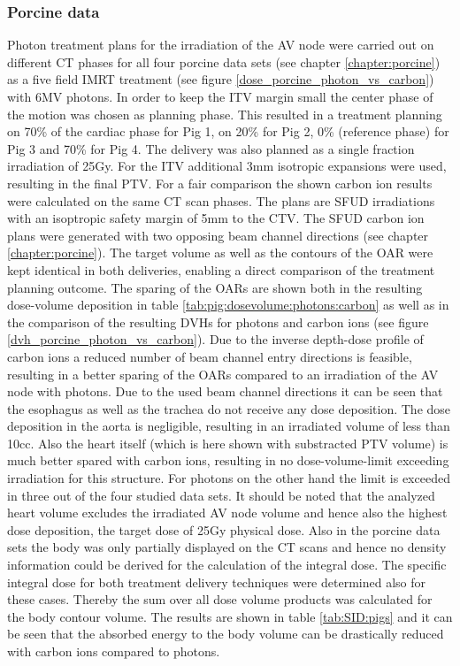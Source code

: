 \newpage

\subsubsection{Porcine data}

Photon treatment plans for the irradiation of the AV node were carried out on different CT phases for all four porcine data sets (see chapter 
\ref{chapter:porcine}) as a five field IMRT treatment (see figure \ref{dose_porcine_photon_vs_carbon}) with 6MV photons. In order to keep the 
ITV margin small the center phase of the motion was chosen as planning phase. This resulted in a treatment planning on 70\% of the cardiac 
phase for Pig 1, on 20\% for Pig 2, 0\% (reference phase) for Pig 3 and 70\% for Pig 4. The delivery was also planned as a single fraction 
irradiation of 25Gy. For the ITV additional 3mm isotropic expansions were used, resulting in the final PTV. For a fair comparison the shown 
carbon ion results were calculated on the same CT scan phases. The plans are SFUD irradiations with an isoptropic safety margin of 5mm to the 
CTV. The SFUD carbon ion plans were generated with two opposing beam channel directions (see chapter \ref{chapter:porcine}). The target volume 
as well as the contours of the OAR were kept identical in both deliveries, enabling a direct comparison of the treatment planning outcome.\newline
\newline
The sparing of the OARs are shown both in the resulting dose-volume deposition 
in table \ref{tab:pig:dosevolume:photons:carbon} as well as in the comparison of the resulting DVHs for photons and carbon 
ions (see figure \ref{dvh_porcine_photon_vs_carbon}). Due to the inverse depth-dose profile of carbon ions a reduced number of beam 
channel entry directions is feasible, resulting in a better sparing of the OARs compared to an irradiation of the AV node with photons. 
Due to the used beam channel directions it can be seen that the esophagus as well as the trachea do not receive any dose deposition. 
The dose deposition in the aorta is negligible, resulting in an irradiated volume of less than 10cc. Also the heart itself (which is here 
shown with substracted PTV volume) is much better 
spared with carbon ions, resulting in no dose-volume-limit exceeding irradiation for this structure. For photons on the other hand 
the limit is exceeded in three out of the four studied data sets. It should be noted that the analyzed heart volume excludes the irradiated 
AV node volume and hence also the highest dose deposition, the target dose of 25Gy physical dose.\newline
\newline
Also in the porcine data sets the body was only partially displayed on the CT scans and hence no density information could be derived for the 
calculation of the integral dose. The specific integral dose for both treatment delivery techniques were determined also for these cases. 
Thereby the sum over all dose volume products was calculated for the body contour volume. The results are shown in 
table \ref{tab:SID:pigs} and it can be seen that the absorbed energy to the body volume can be drastically reduced with carbon ions 
compared to photons.

